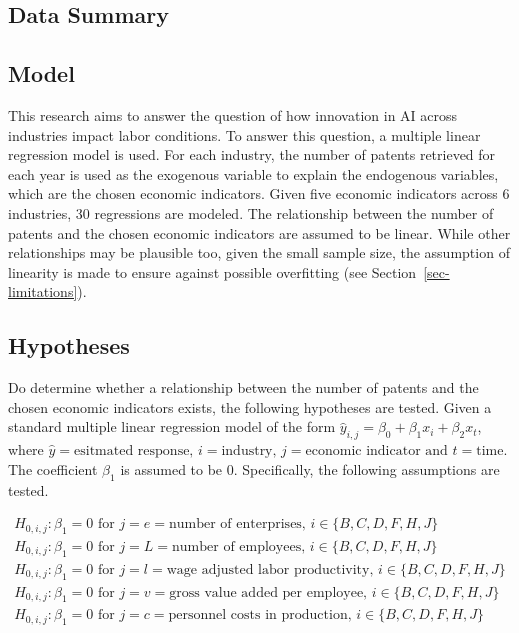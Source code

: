 \documentclass[
  12pt,
  a4paperpaper,
]{article}
\begin{document}
\subsection{Data Summary}\label{sec-data-summary}

\subsection{Model}\label{sec-model}

This research aims to answer the question of how innovation in AI across
industries impact labor conditions. To answer this question, a multiple
linear regression model is used. For each industry, the number of
patents retrieved for each year is used as the exogenous variable to
explain the endogenous variables, which are the chosen economic
indicators. Given five economic indicators across 6 industries, 30
regressions are modeled. The relationship between the number of patents
and the chosen economic indicators are assumed to be linear. While other
relationships may be plausible too, given the small sample size, the
assumption of linearity is made to ensure against possible overfitting
(see Section~\ref{sec-limitations}).

\subsection{Hypotheses}\label{sec-hypotheses}

Do determine whether a relationship between the number of patents and
the chosen economic indicators exists, the following hypotheses are
tested. Given a standard multiple linear regression model of the form
\(\hat{y}_{i,j} = \beta_0 + \beta_1x_i + \beta_2x_t\), where
\(\hat{y}=\text{esitmated response, }i=\text{industry, }j=\text{economic indicator }\text{and }t=\text{time}\).
The coefficient \(\beta_1\) is assumed to be \(0\). Specifically, the
following assumptions are tested.

\begin{align}
H_{0, i, j}: \beta_1 = 0\text{ for }j=e=\text{number of enterprises, } i\in\{B, C, D, F, H, J\} \\
H_{0, i, j}: \beta_1 = 0\text{ for }j=L=\text{number of employees, } i\in\{B, C, D, F, H, J\}\\
H_{0, i, j}: \beta_1 = 0\text{ for }j=l=\text{wage adjusted labor productivity, } i\in\{B, C, D, F, H, J\}\\
H_{0, i, j}: \beta_1 = 0\text{ for }j=v=\text{gross value added per employee, } i\in\{B, C, D, F, H, J\}\\
H_{0, i, j}: \beta_1 = 0\text{ for }j=c=\text{personnel costs in production, } i\in\{B, C, D, F, H, J\}
\end{align}
\end{document}
